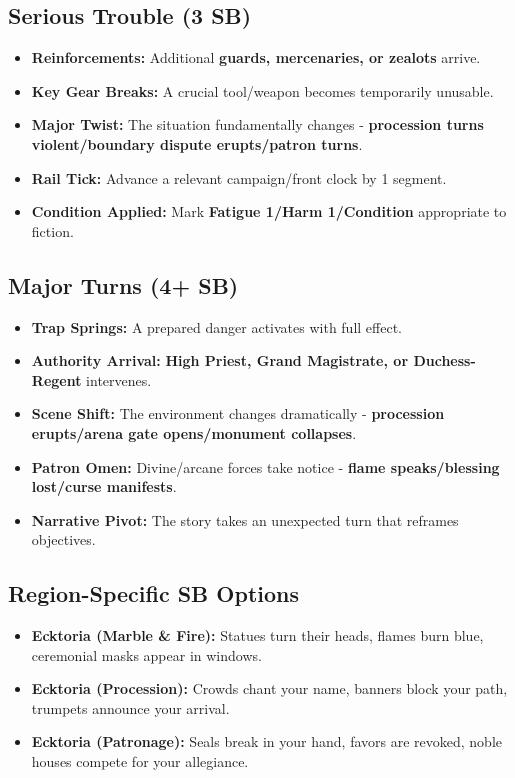 \subsection*{Serious Trouble (3 SB)}
\begin{itemize}
\item \textbf{Reinforcements:} Additional \textbf{guards, mercenaries, or zealots} arrive.
\item \textbf{Key Gear Breaks:} A crucial tool/weapon becomes temporarily unusable.
\item \textbf{Major Twist:} The situation fundamentally changes - \textbf{procession turns violent/boundary dispute erupts/patron turns}.
\item \textbf{Rail Tick:} Advance a relevant campaign/front clock by 1 segment.
\item \textbf{Condition Applied:} Mark \textbf{Fatigue 1/Harm 1/Condition} appropriate to fiction.
\end{itemize}

\subsection*{Major Turns (4+ SB)}
\begin{itemize}
\item \textbf{Trap Springs:} A prepared danger activates with full effect.
\item \textbf{Authority Arrival:} \textbf{High Priest, Grand Magistrate, or Duchess-Regent} intervenes.
\item \textbf{Scene Shift:} The environment changes dramatically - \textbf{procession erupts/arena gate opens/monument collapses}.
\item \textbf{Patron Omen:} Divine/arcane forces take notice - \textbf{flame speaks/blessing lost/curse manifests}.
\item \textbf{Narrative Pivot:} The story takes an unexpected turn that reframes objectives.
\end{itemize}

\subsection*{Region-Specific SB Options}
\begin{itemize}
\item \textbf{Ecktoria (Marble \& Fire):} Statues turn their heads, flames burn blue, ceremonial masks appear in windows.
\item \textbf{Ecktoria (Procession):} Crowds chant your name, banners block your path, trumpets announce your arrival.
\item \textbf{Ecktoria (Patronage):} Seals break in your hand, favors are revoked, noble houses compete for your allegiance.
\end{itemize}
